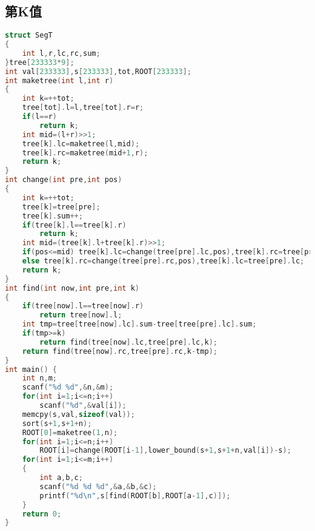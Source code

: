 \subsection{第K值}
    \begin{lstlisting}[language=c++]
struct SegT
{
    int l,r,lc,rc,sum;
}tree[233333*9];
int val[233333],s[233333],tot,ROOT[233333];
int maketree(int l,int r)
{
    int k=++tot;
    tree[tot].l=l,tree[tot].r=r;
    if(l==r)
        return k;
    int mid=(l+r)>>1;    
    tree[k].lc=maketree(l,mid);
    tree[k].rc=maketree(mid+1,r);
    return k;
}
int change(int pre,int pos)
{
    int k=++tot;
    tree[k]=tree[pre];
    tree[k].sum++;
    if(tree[k].l==tree[k].r)
        return k;
    int mid=(tree[k].l+tree[k].r)>>1;
    if(pos<=mid) tree[k].lc=change(tree[pre].lc,pos),tree[k].rc=tree[pre].rc;
    else tree[k].rc=change(tree[pre].rc,pos),tree[k].lc=tree[pre].lc;
    return k;
}
int find(int now,int pre,int k)
{
    if(tree[now].l==tree[now].r)
        return tree[now].l;
    int tmp=tree[tree[now].lc].sum-tree[tree[pre].lc].sum;
    if(tmp>=k)
        return find(tree[now].lc,tree[pre].lc,k);
    return find(tree[now].rc,tree[pre].rc,k-tmp);
}
int main() {
    int n,m;
    scanf("%d %d",&n,&m);
    for(int i=1;i<=n;i++)
        scanf("%d",&val[i]);
    memcpy(s,val,sizeof(val));
    sort(s+1,s+1+n);
    ROOT[0]=maketree(1,n);
    for(int i=1;i<=n;i++)
        ROOT[i]=change(ROOT[i-1],lower_bound(s+1,s+1+n,val[i])-s);
    for(int i=1;i<=m;i++)
    {
        int a,b,c;
        scanf("%d %d %d",&a,&b,&c);
        printf("%d\n",s[find(ROOT[b],ROOT[a-1],c)]);
    }
    return 0;
}
    \end{lstlisting}
